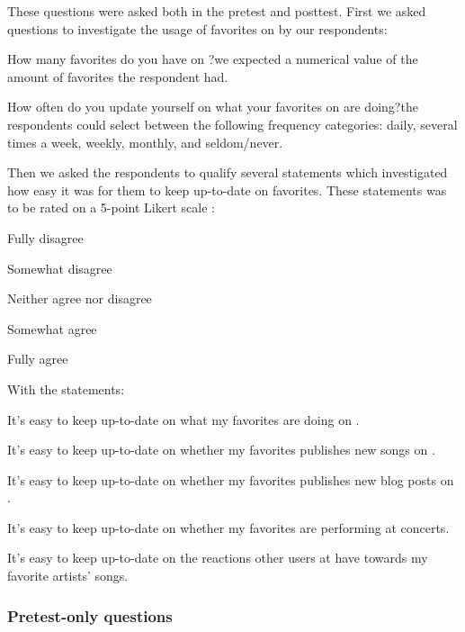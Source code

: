These questions were asked both in the pretest and posttest. First we asked
questions to investigate the usage of favorites on \urort{} by our
respondents:

\begin{items}
  \item How many favorites do you have on \urort{}?\dash{}we expected
    a numerical value of the amount of favorites the respondent had.
  \item How often do you update yourself on what your favorites on \urort{}
    are doing?\dash{}the respondents could select between the following
    frequency categories: daily, several times a week, weekly, monthly,
    and seldom/never.
\end{items}

Then we asked the respondents to qualify several statements which investigated
how easy it was for them to keep up-to-date on favorites.
These statements
was to be rated on a 5-point Likert scale \citep{likert32}:

\begin{items}
  \item Fully disagree
  \item Somewhat disagree
  \item Neither agree nor disagree
  \item Somewhat agree
  \item Fully agree
\end{items}

With the statements:

\begin{items}
  \item It's easy to keep up-to-date on what my favorites are doing
    on \urort{}.
  \item It's easy to keep up-to-date on whether my favorites publishes
    new songs on \urort{}.
  \item It's easy to keep up-to-date on whether my favorites publishes
    new blog posts on \urort{}.
  \item It's easy to keep up-to-date on whether my favorites are
    performing at concerts.
  \item It's easy to keep up-to-date on the reactions other users at
    \urort{} have towards my favorite artists' songs.
\end{items}

\subsubsection{Pretest-only questions}

